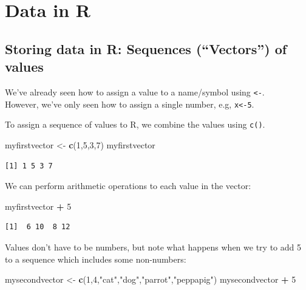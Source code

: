\documentclass[]{book}
\newenvironment{Shaded}{\begin{snugshade}}{\end{snugshade}}
\newcommand{\DecValTok}[1]{\textcolor[rgb]{0.00,0.00,0.81}{#1}}
\newcommand{\KeywordTok}[1]{\textcolor[rgb]{0.13,0.29,0.53}{\textbf{#1}}}
\newcommand{\NormalTok}[1]{#1}
\newcommand{\OperatorTok}[1]{\textcolor[rgb]{0.81,0.36,0.00}{\textbf{#1}}}
\newcommand{\StringTok}[1]{\textcolor[rgb]{0.31,0.60,0.02}{#1}}
\begin{document}
\hypertarget{data-in-r}{%
\section{Data in R}\label{data-in-r}}

\hypertarget{storing-data-in-r-sequences-vectors-of-values}{%
\subsection*{Storing data in R: Sequences (``Vectors'') of values}\label{storing-data-in-r-sequences-vectors-of-values}}

We've already seen how to assign a value to a name/symbol using \texttt{\textless{}-}.\\
However, we've only seen how to assign a single number, e.g, \texttt{x\textless{}-5}.

To assign a sequence of values to R, we combine the values using \texttt{c()}.

\begin{Shaded}
\begin{Highlighting}[]
\NormalTok{myfirstvector <-}\StringTok{ }\KeywordTok{c}\NormalTok{(}\DecValTok{1}\NormalTok{,}\DecValTok{5}\NormalTok{,}\DecValTok{3}\NormalTok{,}\DecValTok{7}\NormalTok{)}
\NormalTok{myfirstvector}
\end{Highlighting}
\end{Shaded}

\begin{verbatim}
[1] 1 5 3 7
\end{verbatim}

We can perform arithmetic operations to each value in the vector:

\begin{Shaded}
\begin{Highlighting}[]
\NormalTok{myfirstvector }\OperatorTok{+}\StringTok{ }\DecValTok{5}
\end{Highlighting}
\end{Shaded}

\begin{verbatim}
[1]  6 10  8 12
\end{verbatim}

Values don't have to be numbers, but note what happens when we try to add 5 to a sequence which includes some non-numbers:

\begin{Shaded}
\begin{Highlighting}[]
\NormalTok{mysecondvector <-}\StringTok{ }\KeywordTok{c}\NormalTok{(}\DecValTok{1}\NormalTok{,}\DecValTok{4}\NormalTok{,}\StringTok{"cat"}\NormalTok{,}\StringTok{"dog"}\NormalTok{,}\StringTok{"parrot"}\NormalTok{,}\StringTok{"peppapig"}\NormalTok{)}
\NormalTok{mysecondvector }\OperatorTok{+}\StringTok{ }\DecValTok{5}
\end{Highlighting}
\end{Shaded}
\end{document}
